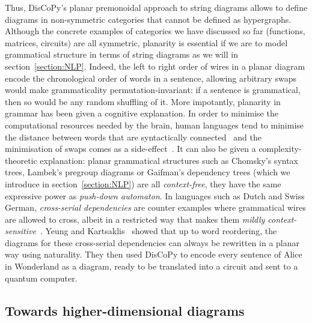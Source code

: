 Thus, DisCoPy's planar premonoidal approach to string diagrams allows to define diagrams in non-symmetric categories that cannot be defined as hypergraphs.
Although the concrete examples of categories we have discussed so far (functions, matrices, circuits) are all symmetric, planarity is essential if we are to model grammatical structure in terms of string diagrams as we will in section~\ref{section:NLP}.
Indeed, the left to right order of wires in a planar diagram encode the chronological order of words in a sentence, allowing arbitrary swaps would make grammaticality permutation-invariant: if a sentence is grammatical, then so would be any random shuffling of it.
More impotantly, planarity in grammar has been given a cognitive explanation.
In order to minimise the computational resources needed by the brain, human languages tend to minimise the distance between words that are syntactically connected~\cite{FutrellEtAl15} and the minimisation of swaps comes as a side-effect~\cite{Cancho06}.
It can also be given a complexity-theoretic explanation: planar grammatical structures such as Chomsky's syntax trees, Lambek's pregroup diagrams or Gaifman's dependency trees (which we introduce in section~\ref{section:NLP}) are all \emph{context-free}, they have the same expressive power as \emph{push-down automaton}.
In languages such as Dutch and Swiss German, \emph{cross-serial dependencies} are counter examples where grammatical wires are allowed to cross, albeit in a restricted way that makes them \emph{mildly context-sensitive}~\cite{Stabler04}.
Yeung and Kartsaklis~\cite{YeungKartsaklis21} showed that up to word reordering, the diagrams for these cross-serial dependencies can always be rewritten in a planar way using naturality.
They then used DisCoPy to encode every sentence of Alice in Wonderland as a diagram, ready to be translated into a circuit and sent to a quantum computer.

\subsection{Towards higher-dimensional diagrams}\label{subsection:towards-higher}

